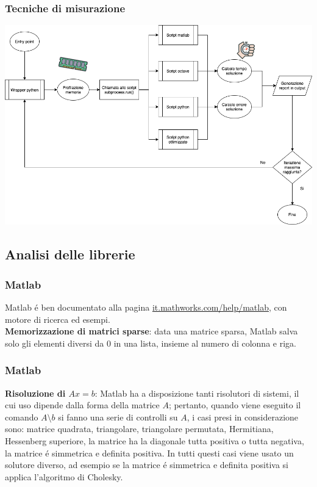 \documentclass{beamer}
\begin{document}
\begin{frame}
	
	\frametitle{Tecniche di misurazione}
	
	\includegraphics[height=0.6\textwidth]{assets/execution_workflow.png}
	
\end{frame}

\subsection{Analisi delle librerie}

\begin{frame}	
\frametitle{Matlab}
Matlab \'e ben documentato alla pagina \url{it.mathworks.com/help/matlab}, con motore di ricerca ed esempi.\\
\textbf{Memorizzazione di matrici sparse}: data una matrice sparsa, Matlab salva solo gli elementi diversi da 0 in una lista, insieme al numero di colonna e riga. 
\end{frame}
\begin{frame}
\frametitle{Matlab}
\textbf{Risoluzione di $Ax = b$}: Matlab ha a disposizione tanti risolutori di sistemi, il cui uso dipende dalla forma della matrice $A$; pertanto, quando viene eseguito il comando $A \setminus b$ si fanno una serie di controlli su $A$, i casi presi in considerazione sono: matrice quadrata, triangolare, triangolare permutata, Hermitiana, Hessenberg superiore, la matrice ha la diagonale tutta positiva o tutta negativa, la matrice \'e simmetrica e definita positiva. In tutti questi casi viene usato un solutore diverso, ad esempio se la matrice \'e simmetrica e definita positiva si applica l'algoritmo di Cholesky.
\end{frame}
\end{document}
